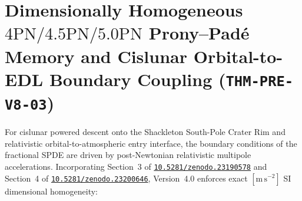 \documentclass[11pt,a4paper,reqno]{article}
\newcommand{\zenodo}[1]{\href{https://doi.org/10.5281/zenodo.#1}{\nolinkurl{10.5281/zenodo.#1}}}
\theoremstyle{plain}
\theoremstyle{definition}
\theoremstyle{remark}
\numberwithin{equation}{section}
\begin{document}
\section{Dimensionally Homogeneous \texorpdfstring{$4\mathrm{PN}/4.5\mathrm{PN}/5.0\mathrm{PN}$}{4PN/4.5PN/5.0PN} Prony--Pad\'e Memory and Cislunar Orbital-to-EDL Boundary Coupling (\texttt{THM-PRE-V8-03})}
\label{sec:hereditary_4pn_5pn_spde_v4}

For cislunar powered descent onto the Shackleton South-Pole Crater Rim and relativistic orbital-to-atmospheric entry interface, the boundary conditions of the fractional SPDE are driven by post-Newtonian relativistic multipole accelerations. Incorporating Section~3 of \zenodo{23190578} and Section~4 of \zenodo{23200646}, Version~4.0 enforces exact $[\mathrm{m\,s^{-2}}]$ SI dimensional homogeneity:
\end{document}
